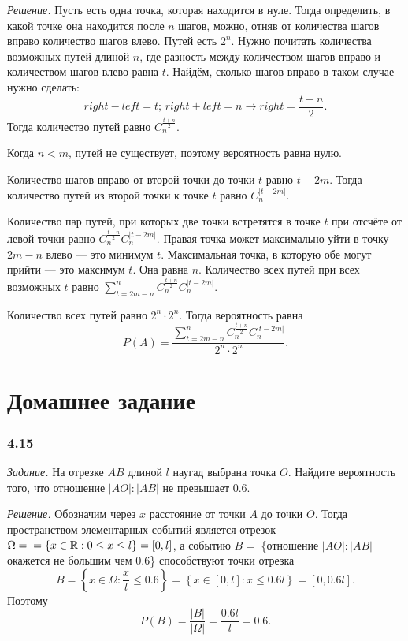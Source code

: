 \textit{Решение.} Пусть есть одна точка, которая находится в нуле.
Тогда определить, в какой точке она находится после $n$ шагов, можно, отняв от количества шагов вправо количество шагов влево.
Путей есть $2^n$.
Нужно почитать количества возможных путей длиной $n$, где разность между количеством шагов вправо и количеством шагов влево равна $t$.
Найдём, сколько шагов вправо в таком случае нужно сделать:
$$right - left = t; \, right + left = n \rightarrow right = \frac{t+n}{2}.$$
Тогда количество путей равно $C_n^{ \frac{t+n}{2} }$.

Когда $n < m$, путей не существует, поэтому вероятность равна нулю.

Количество шагов вправо от второй точки до точки $t$ равно $t - 2m$.
Тогда количество путей из второй точки к точке $t$ равно $C_n^{ \left| t-2m \right| }$.

Количество пар путей, при которых две точки встретятся в точке $t$ при отсчёте от левой точки равно $C_n^{ \frac{t+n}{2} } C_n^{ \left| t-2m \right| }$.
Правая точка может максимально уйти в точку $2m - n$ влево --- это минимум $t$.
Максимальная точка, в которую обе могут прийти --- это максимум $t$.
Она равна $n$.
Количество всех путей при всех возможных $t$ равно $ \sum \limits_{t=2m-n}^n C_n^{ \frac{t+n}{2} } C_n^{ \left| t-2m \right| }$.

Количество всех путей равно $2^n \cdot 2^n$.
Тогда вероятность равна
$$P \left( A \right) =
\frac{ \sum \limits_{t=2m-n}^n C_n^{ \frac{t+n}{2} } C_n^{ \left| t-2m \right| }}{2^n \cdot 2^n}.$$

\section*{Домашнее задание}

\subsubsection*{4.15}

\textit{Задание.} На отрезке $AB$ длиной $l$ наугад выбрана точка $O$.
Найдите вероятность того, что отношение $|AO|:|AB|$ не превышает $0.6$.

\textit{Решение.} Обозначим через $x$ расстояние от точки $A$ до точки $O$.
Тогда пространством элементарных событий является отрезок
$ \Omega = \\
= \left\{ x \in \mathbb{R}: 0 \leq x \leq l \right\} =
\left[ 0, l \right] $,
а событию $B = $ 
\{отношение $|AO|:|AB|$ окажется не большим чем $0.6$\}
способствуют точки отрезка
$$B =
\left\{ x \in \Omega : \frac{x}{l} \leq 0.6 \right\} =
\left\{ x \in \left[ 0, l \right] : x \leq 0.6 l \right\} =
\left[ 0, 0.6 l \right].$$
Поэтому
$$P \left( B \right) =
\frac{|B|}{| \Omega |} =
\frac{0.6 l}{l} =
0.6.$$

